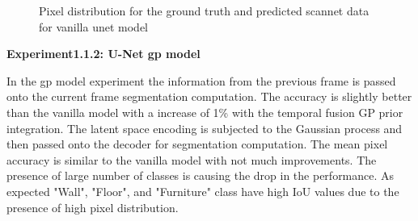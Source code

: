 	\begin{figure}%
		\centering
		\qquad
		\caption{Pixel distribution for the ground truth and predicted scannet data for vanilla unet model}%
		\label{fig:y_gt_pred_vanilla}%
	\end{figure}
    { \bf Experiment1.1.2: U-Net gp model}
    
    In the gp model experiment the information from the previous frame is passed onto the current frame segmentation computation. The accuracy is slightly better than the vanilla model with a increase of 1\% with the temporal fusion GP prior integration. The latent space encoding is subjected to the Gaussian process and then passed onto the decoder for segmentation computation. The mean pixel accuracy is similar to the vanilla model with not much improvements. The presence of large number of classes is causing the drop in the performance. As expected "Wall", "Floor", and "Furniture" class have high IoU values due to the presence of high pixel distribution. 
    
